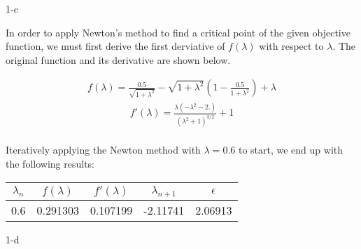 \documentclass[11pt]{article}
\begin{document}
\begin{prob}{1-c}
\end{prob}
\begin{sol} 

In order to apply Newton's method to find a critical point of the given objective function, we must first derive the first derviative of $f(\lambda)$ with respect to $\lambda$. The original function and its derivative are shown below.

\begin{eqnarray*}
f(\lambda)=\frac{0.5}{\sqrt{1+\lambda^2}}-\sqrt{1+\lambda^2} \left(1-\frac{0.5}{1+\lambda^2}\right)+\lambda
\end{eqnarray*}
\begin{eqnarray*}
f'(\lambda)=\frac{\lambda \left(-\lambda^2-2.\right)}{\left(\lambda^2+1\right)^{3/2}}+1 \\
\end{eqnarray*}

Iteratively applying the Newton method with $\lambda = 0.6$ to start, we end up with the following results:

\begin{center}
  \begin{tabular}{| c | c | c | c | c |}
    \hline
	$\lambda_{n}$ & $f(\lambda)$ & $f'(\lambda)$ & $\lambda_{n+1}$ & $\epsilon$ \\ \hline
	0.6 & 0.291303 & 0.107199 & -2.11741 & 2.06913 \\ \hline
	
  \end{tabular}
\end{center}

\end{sol}

\begin{prob}{1-d}
\end{prob}
\begin{sol} 



\end{sol}
\end{document}
